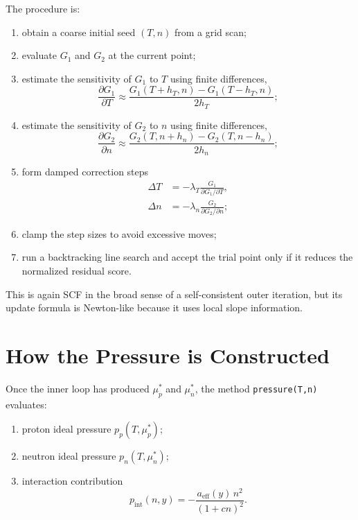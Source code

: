 \documentclass[11pt]{article}
\begin{document}
The procedure is:
\begin{enumerate}
\item obtain a coarse initial seed $(T,n)$ from a grid scan;
\item evaluate $G_1$ and $G_2$ at the current point;
\item estimate the sensitivity of $G_1$ to $T$ using finite differences,
\begin{equation}
\frac{\partial G_1}{\partial T}
\approx
\frac{G_1(T+h_T,n)-G_1(T-h_T,n)}{2h_T};
\end{equation}
\item estimate the sensitivity of $G_2$ to $n$ using finite differences,
\begin{equation}
\frac{\partial G_2}{\partial n}
\approx
\frac{G_2(T,n+h_n)-G_2(T,n-h_n)}{2h_n};
\end{equation}
\item form damped correction steps
\begin{align}
\Delta T &= -\lambda_T \frac{G_1}{\partial G_1/\partial T}, \\
\Delta n &= -\lambda_n \frac{G_2}{\partial G_2/\partial n};
\end{align}
\item clamp the step sizes to avoid excessive moves;
\item run a backtracking line search and accept the trial point only if it
reduces the normalized residual score.
\end{enumerate}

This is again SCF in the broad sense of a self-consistent outer iteration, but
its update formula is Newton-like because it uses local slope information.

\section{How the Pressure is Constructed}

Once the inner loop has produced $\mu_p^\ast$ and $\mu_n^\ast$, the method
\texttt{pressure(T,n)} evaluates:
\begin{enumerate}
\item proton ideal pressure $p_p(T,\mu_p^\ast)$;
\item neutron ideal pressure $p_n(T,\mu_n^\ast)$;
\item interaction contribution
\begin{equation}
p_{\mathrm{int}}(n,y) =
-\frac{a_{\mathrm{eff}}(y)\, n^2}{(1 + cn)^2}.
\end{equation}
\end{enumerate}
\end{document}
